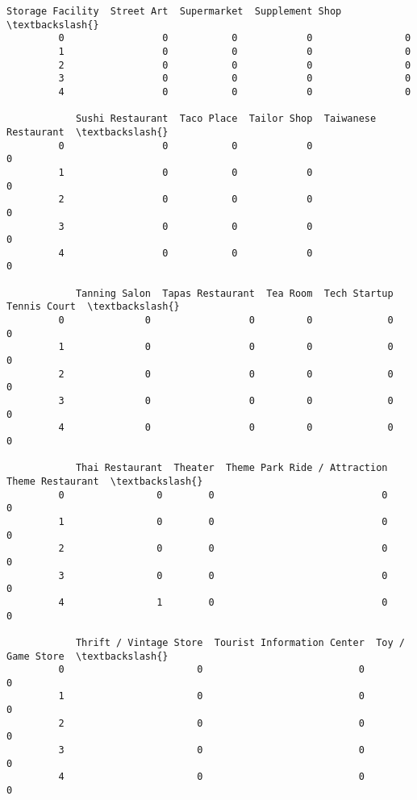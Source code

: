 \documentclass[11pt]{article}
\begin{document}
\begin{Verbatim}[commandchars=\\\{\}]
            Storage Facility  Street Art  Supermarket  Supplement Shop  \textbackslash{}
         0                 0           0            0                0   
         1                 0           0            0                0   
         2                 0           0            0                0   
         3                 0           0            0                0   
         4                 0           0            0                0   
         
            Sushi Restaurant  Taco Place  Tailor Shop  Taiwanese Restaurant  \textbackslash{}
         0                 0           0            0                     0   
         1                 0           0            0                     0   
         2                 0           0            0                     0   
         3                 0           0            0                     0   
         4                 0           0            0                     0   
         
            Tanning Salon  Tapas Restaurant  Tea Room  Tech Startup  Tennis Court  \textbackslash{}
         0              0                 0         0             0             0   
         1              0                 0         0             0             0   
         2              0                 0         0             0             0   
         3              0                 0         0             0             0   
         4              0                 0         0             0             0   
         
            Thai Restaurant  Theater  Theme Park Ride / Attraction  Theme Restaurant  \textbackslash{}
         0                0        0                             0                 0   
         1                0        0                             0                 0   
         2                0        0                             0                 0   
         3                0        0                             0                 0   
         4                1        0                             0                 0   
         
            Thrift / Vintage Store  Tourist Information Center  Toy / Game Store  \textbackslash{}
         0                       0                           0                 0   
         1                       0                           0                 0   
         2                       0                           0                 0   
         3                       0                           0                 0   
         4                       0                           0                 0   
         

\end{Verbatim}
\end{document}
